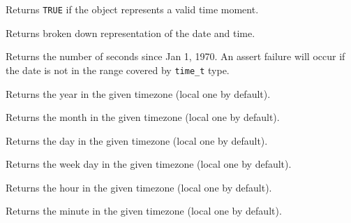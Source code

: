 Returns {\tt TRUE} if the object represents a valid time moment.

\label{wxdatetimegettm}


Returns broken down representation of the date and time.

\label{wxdatetimegetticks}


Returns the number of seconds since Jan 1, 1970. An assert failure will occur
if the date is not in the range covered by {\tt time\_t} type.

\label{wxdatetimegetyear}


Returns the year in the given timezone (local one by default).

\label{wxdatetimegetmonth}


Returns the month in the given timezone (local one by default).

\label{wxdatetimegetday}


Returns the day in the given timezone (local one by default).

\label{wxdatetimegetweekday}


Returns the week day in the given timezone (local one by default).

\label{wxdatetimegethour}


Returns the hour in the given timezone (local one by default).

\label{wxdatetimegetminute}


Returns the minute in the given timezone (local one by default).

